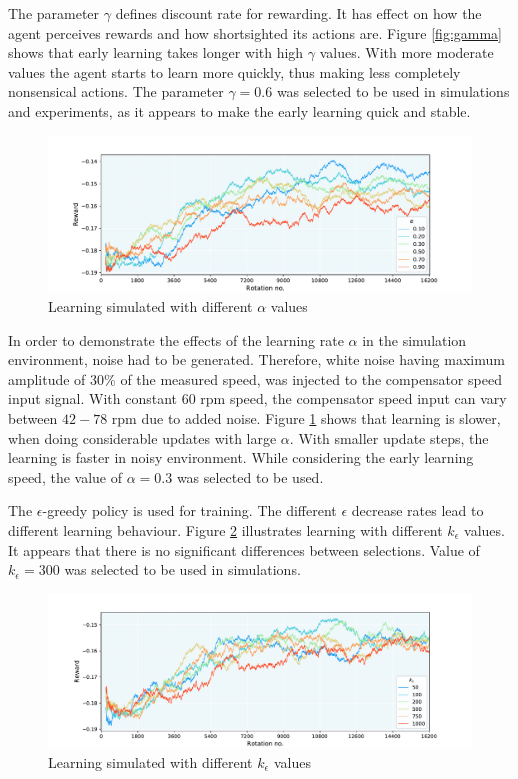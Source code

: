 The parameter $\gamma$ defines discount rate for rewarding. It has effect on how the agent perceives rewards and how shortsighted its actions are. Figure \ref{fig:gamma} shows that early learning takes longer with high $\gamma$ values. With more moderate values the agent starts to learn more quickly, thus making less completely nonsensical actions. The parameter $\gamma = 0.6$ was selected to be used in simulations and experiments, as it appears to make the early learning quick and stable.
\begin{figure}[htb] 
    \centering
    \includegraphics[width=\textwidth]{images/Qalpha_wide.pdf}
    \caption{\small Learning simulated with different $\alpha$ values}
    \label{fig:alpha}
\end{figure}

In order to demonstrate the effects of the learning rate $\alpha$ in the simulation environment, noise had to be generated. Therefore, white noise having maximum amplitude of 30\% of the measured speed, was injected to the compensator speed input signal. With constant $60$ rpm speed, the compensator speed input can vary between $42-78$ rpm due to added noise. Figure \ref{fig:alpha} shows that learning is slower, when doing considerable updates with large $\alpha$. With smaller update steps, the learning is faster in noisy environment. While considering the early learning speed, the value of $\alpha = 0.3$ was selected to be used.

The $\epsilon$-greedy policy is used for training. The different $\epsilon$ decrease rates lead to different learning behaviour. Figure \ref{fig:glie} illustrates learning with different $k_\epsilon$ values. It appears that there is no significant differences between selections. Value of $k_\epsilon = 300$ was selected to be used in simulations.

\begin{figure}[htb] 
    \centering
    \includegraphics[width=\textwidth]{images/Qk_wide.pdf}
    \caption{\small Learning simulated with different $k_{\epsilon}$ values}
    \label{fig:glie}
\end{figure}

\clearpage
